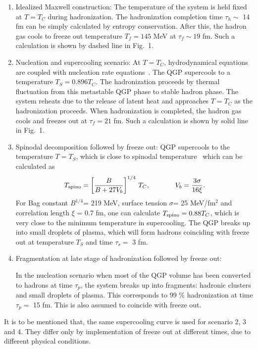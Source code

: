 \begin{enumerate}

\item Idealized Maxwell construction:
    The temperature of the system is held fixed at $T=T_C$ 
    during hadronization. The hadronization completion time 
    $\tau_h\sim$ 14 fm can be simply calculated by entropy conservation.
    After this, the hadron gas cools to freeze out temperature 
    $T_f=145$ MeV at $\tau_f\sim 19$ fm. Such a calculation is shown by 
    dashed line in Fig.~1.

\item  Nucleation and supercooling scenario:
   At $T=T_C$, hydrodynamical equations are coupled with nucleation 
  rate equations~\cite{SPINO}. The QGP supercools to a temperature 
  $T_S=0.896T_C$. The hadronization proceeds by 
 thermal fluctuation from this metastable QGP phase to stable hadron phase. 
 The system reheats due to the release of latent heat and approaches
 $T=T_C$ as the hadronization proceeds. When hadronization is completed,  
 the hadron gas cools and freezes out at $\tau_f=21$ fm.
 Such a calculation is shown by solid line in Fig.~1.

\item Spinodal decomposition followed by freeze out:
  QGP supercools to the temperature $T=T_S$, which is close to spinodal 
  temperature~\cite{SPINO} which can be calculated as 
\begin{equation} 
T_{\rm spino}= \left[{B \over B+ 27 V_b} \right]^{1/4} \, T_C, 
  \hspace{.5in} V_b = {3\sigma \over 16 \xi}.
\end{equation}
For Bag constant $B^{1/4}$= 219 MeV,
surface tension $\sigma$= 25 MeV/fm$^2$ and correlation length $\xi$ = 0.7 fm,
one can calculate 
$T_{\rm spino}=0.88 T_C$, which is very close to the minimum temperature
in supercooling. 
 The QGP breaks up into small droplets of plasma, which will form 
hadrons coinciding with freeze out at temperature $T_S$ and
time $\tau_s=$ 3 fm.


\item Fragmentation at late stage of hadronization followed by freeze out:

  In the nucleation scenario when most of the QGP volume has been 
converted to hadrons at time $\tau_p$, the system breaks up into fragments: 
hadronic clusters and small droplets of plasma. 
 This corresponds to 99 \%  hadronization at time $\tau_p=$ 15 fm.
This is also assumed to coincide with freeze out.
\end{enumerate}
 It is to be mentioned that, the same supercooling curve is used for 
scenario 2, 3 and 4. They differ only by implementation of freeze
out at different times, due to different physical conditions.


